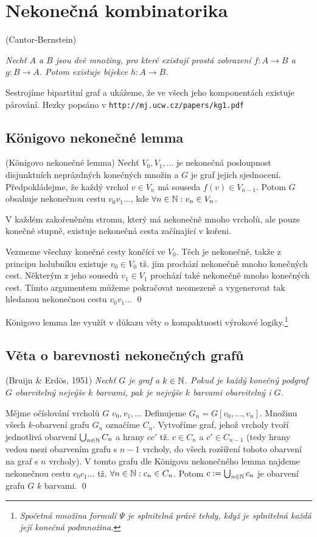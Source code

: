 \section{Nekonečná kombinatorika}

\vt (Cantor-Bernstein) {\it Nechť $A$ a $B$ jsou dvě množiny, pro které existují prostá zobrazení $f: A \rightarrow B$ a $g: B \rightarrow A$. Potom existuje bijekce $h: A \rightarrow B$.

\dk Sestrojíme bipartitní graf a ukážeme, že ve všech jeho komponentách existuje párování. Hezky popsáno v \texttt{http://mj.ucw.cz/papers/kg1.pdf}

\subsection{Königovo nekonečné lemma}

\lm (Königovo nekonečné lemma) Nechť $V_0,V_1,\dots$ je nekonečná posloupnost disjunktních neprázdných konečných množin a $G$ je graf jejich sjednocení. Předpokládejme, že každý vrchol $v \in V_n$ má souseda $f(v) \in V_{n-1}$. Potom $G$ obsahuje nekonečnou cestu $v_0v_1\dots$, kde $\forall n\in \mathbb{N}: v_n\in V_n$.

\medskip{} V každém zakořeněném stromu, který má nekonečně mnoho vrcholů, ale pouze konečné stupně, existuje nekonečná cesta začínající v kořeni.

\dk Vezmeme všechny konečné cesty končící ve $V_0$. Těch je nekonečně, takže z principu holubníku existuje $v_0\in V_0$ tž. jím prochází nekonečně mnoho konečných cest. Některým z jeho sousedů $v_1\in V_1$ prochází také nekonečně mnoho konečných cest. Tímto argumentem můžeme pokračovat neomezeně a vygenerovat tak hledanou nekonečnou cestu $v_0v_1\dots$
\qed

Königovo lemma lze využít v důkazu věty o kompaktnosti výrokové logiky.\footnote{\it Spočetná množina formulí $\Psi$ je splnitelná právě tehdy, když je splnitelná každá její konečná podmnožina.}

\subsection{Věta o barevnosti nekonečných grafů}

\vt (Bruijn \& Erdös, 1951) {\it Nechť $G$ je graf a $k\in \mathbb{N}$. Pokud je každý konečný podgraf $G$ obarvitelný nejvýše $k$ barvami, pak je nejvýše $k$ barvami obarvitelný i $G$.}

\dk Mějme očíslování vrcholů $G$ $v_0, v_1, \dots$ Definujeme $G_n = G[v_0,\dots, v_n]$. Množinu všech $k$-obarvení grafu $G_n$ označíme $C_n$. Vytvoříme graf, jehož vrcholy tvoří jednotlivá obarvení $\bigcup_{n\in\mathbb{N}} C_n$ a hrany $cc'$ tž. $c\in C_n$ a $c'\in C_{n-1}$ (tedy hrany vedou mezi obarvením grafu s $n-1$ vrcholy, do všech rozšíření tohoto obarvení na graf s $n$ vrcholy). V tomto grafu dle Königova nekonečného lemma najdeme nekonečnou cestu $c_0c_1\dots$ tž. $\forall n\in\mathbb{N}: c_n \in C_n$. Potom $c := \bigcup_{n\in\mathbb{N}}c_n$ je obarvení grafu $G$ $k$ barvami.
\qed

}
